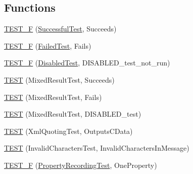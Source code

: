\subsection*{Functions}
\begin{DoxyCompactItemize}
\item 
\mbox{\hyperlink{_obj__test_2lib_2googletest-release-1_88_81_2googletest_2test_2gtest__xml__output__unittest___8cc_aa6dc865a2584304f44da9f4b085f8e08}{T\+E\+S\+T\+\_\+F}} (\mbox{\hyperlink{class_successful_test}{Successful\+Test}}, Succeeds)
\item 
\mbox{\hyperlink{_obj__test_2lib_2googletest-release-1_88_81_2googletest_2test_2gtest__xml__output__unittest___8cc_a0789e983f69fddd50cd6a2ad73a167c2}{T\+E\+S\+T\+\_\+F}} (\mbox{\hyperlink{class_failed_test}{Failed\+Test}}, Fails)
\item 
\mbox{\hyperlink{_obj__test_2lib_2googletest-release-1_88_81_2googletest_2test_2gtest__xml__output__unittest___8cc_a743749af716f6da79472d5a662e31723}{T\+E\+S\+T\+\_\+F}} (\mbox{\hyperlink{class_disabled_test}{Disabled\+Test}}, D\+I\+S\+A\+B\+L\+E\+D\+\_\+test\+\_\+not\+\_\+run)
\item 
\mbox{\hyperlink{_obj__test_2lib_2googletest-release-1_88_81_2googletest_2test_2gtest__xml__output__unittest___8cc_a32b81caf894a39956292191e0ac9efe8}{T\+E\+ST}} (Mixed\+Result\+Test, Succeeds)
\item 
\mbox{\hyperlink{_obj__test_2lib_2googletest-release-1_88_81_2googletest_2test_2gtest__xml__output__unittest___8cc_adb093d371e5672f26e82d2df1e66e311}{T\+E\+ST}} (Mixed\+Result\+Test, Fails)
\item 
\mbox{\hyperlink{_obj__test_2lib_2googletest-release-1_88_81_2googletest_2test_2gtest__xml__output__unittest___8cc_a34e71da1ce98b2984594c8db97018c75}{T\+E\+ST}} (Mixed\+Result\+Test, D\+I\+S\+A\+B\+L\+E\+D\+\_\+test)
\item 
\mbox{\hyperlink{_obj__test_2lib_2googletest-release-1_88_81_2googletest_2test_2gtest__xml__output__unittest___8cc_a6ac53dbcf6b02f01cc4f2486db8dd9dc}{T\+E\+ST}} (Xml\+Quoting\+Test, Outputs\+C\+Data)
\item 
\mbox{\hyperlink{_obj__test_2lib_2googletest-release-1_88_81_2googletest_2test_2gtest__xml__output__unittest___8cc_aa07f760144874b77158b9336bdc95c93}{T\+E\+ST}} (Invalid\+Characters\+Test, Invalid\+Characters\+In\+Message)
\item 
\mbox{\hyperlink{_obj__test_2lib_2googletest-release-1_88_81_2googletest_2test_2gtest__xml__output__unittest___8cc_af81998ca9ca595e3107c142ebd25e0d5}{T\+E\+S\+T\+\_\+F}} (\mbox{\hyperlink{class_property_recording_test}{Property\+Recording\+Test}}, One\+Property)

\end{DoxyCompactItemize}
